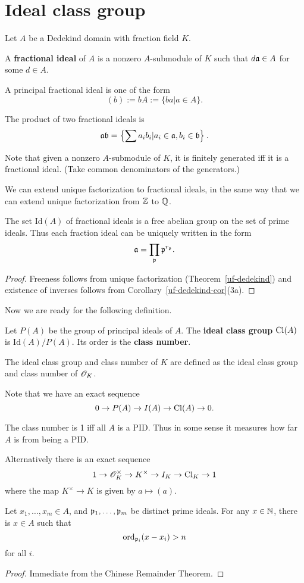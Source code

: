 \section{Ideal class group}
Let $A$ be a Dedekind domain with fraction field $K$.
\begin{df}
A \textbf{fractional ideal} of $A$ is a nonzero $A$-submodule of $K$ such that $d\mathfrak{a}\in A$ for some $d\in A$.

A principal fractional ideal is one of the form
\[(b):=bA:=\{ba|a\in A\}.\]

The product of two fractional ideals is
\[\mathfrak{a}\mathfrak{b}=\left\{ {\sum a_ib_i|a_i\in \mathfrak{a},b_i\in \mathfrak{b}} \right\}.\]
\end{df}
Note that given a nonzero $A$-submodule of $K$, it is finitely generated iff it is a fractional ideal. (Take common denominators of the generators.)

We can extend unique factorization to fractional ideals, in the same way that we can extend unique factorization from $\mathbb{Z}$ to $\mathbb{Q}$.
\begin{thm}
The set $\text{Id}(A)$ of fractional ideals is a free abelian group on the set of prime ideals. Thus each fraction ideal can be uniquely written in the form
\[
\mathfrak{a}=\prod_{\mathfrak{p}} \mathfrak{p}^{r_{\mathfrak{p}}}.
\]
\end{thm}
\begin{proof}
Freeness follows from unique factorization (Theorem~\ref{uf-dedekind}) and existence of inverses follows from Corollary~\ref{uf-dedekind-cor}(3a).
\end{proof}

Now we are ready for the following definition.
\begin{df}
Let $P(A)$ be the group of principal ideals of $A$. 
The \textbf{ideal class group} $\operatorname{Cl}(A)$ is
$\text{Id}(A)/P(A)$. Its order is the \textbf{class number}.

The ideal class group and class number of $K$ are defined as the ideal class group and class number of $\mathscr{O}_K$.
\end{df}
Note that we have an exact sequence
\[
0\to P(A)\to I(A)\to \operatorname{Cl}(A)\to 0.
\]

The class number is 1 iff all $A$ is a PID. Thus in some sense it measures how far $A$ is from being a PID.

Alternatively there is an exact sequence
\[
1\to \mathscr{O}_K^{\times} \to K^{\times} \to I_K \to \operatorname{Cl}_K\to 1
\]
where the map $K^{\times} \to K$ is given by $a\mapsto (a)$.
\begin{thm}
Let $x_1,\ldots, x_m\in A$, and $\mathfrak{p}_1,\ldots, \mathfrak{p}_m$ be distinct prime ideals. For any $x\in \mathbb{N}$, there is $x\in A$ such that 
\[\operatorname{ord}_{\mathfrak{p}_i}(x-x_i)>n\]
for all $i$.
\end{thm}
\begin{proof}
Immediate from the Chinese Remainder Theorem.
\end{proof}
